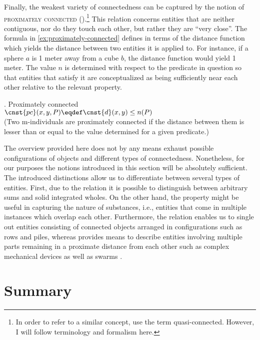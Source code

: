 Finally, the weakest variety of connectedness can be captured by the notion of \textsc{proximately connected} ().\footnote{In order to refer to a similar concept, \citet{casati_varzi1999parts} use the term quasi-connected. However, I will follow  terminology and formalism here.} This relation concerns entities that are neither contiguous, nor do they touch each other, but rather they are ``very close''. The formula in \ref{ex:proximately-connected} defines  in terms of the distance function  which yields the distance between two entities it is applied to. For instance, if a sphere $a$ is 1 meter away from a cube $b$, the distance function  would yield 1 meter. The value $n$ is determined with respect to the predicate in question so that entities that satisfy it are conceptualized as being sufficiently near each other relative to the relevant property.

\ex. Proximately connected \citep[p. 135; adapted]{grimm2012number}\label{ex:proximately-connected}\\
$\cnst{pc}(x,y,P) \eqdef \cnst{d}(x,y) \leq n(P)$\\
(Two m-individuals are proximately connected if the distance between them is lesser than or equal to the value determined for a given predicate.)

The overview provided here does not by any means exhaust possible configurations of objects and different types of connectedness. Nonetheless, for our purposes the notions introduced in this section will be absolutely sufficient. The introduced distinctions allow us to differentiate between several types of entities. First, due to the  relation it is possible to distinguish between arbitrary sums and solid integrated wholes. On the other hand, the  property might be useful in capturing the nature of substances, i.e., entities that come in multiple instances which overlap each other. Furthermore, the  relation enables us to single out entities consisting of connected objects arranged in configurations such as rows and piles, whereas  provides means to describe entities involving multiple parts remaining in a proximate distance from each other such as complex mechanical devices as well as swarms \citep[see, e.g., ][]{henderson2017swarms}.

\section{Summary}\label{sec:summary-ch6}

